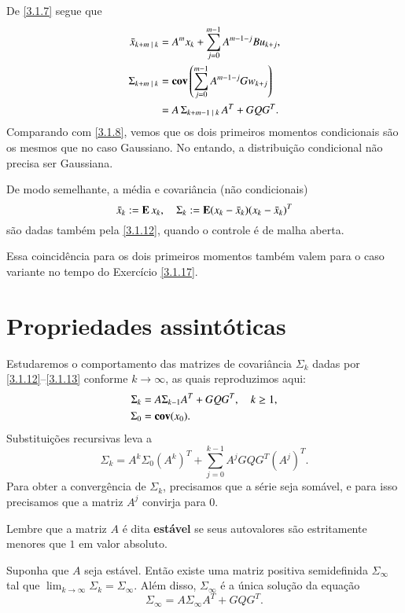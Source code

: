 De \eqref{3.1.7} segue que
\[
\begin{aligned}
	\bar x_{k+m\;|\;k}&= A^mx_k+
	\sum_{j=0}^{m-1}A^{m-1-j}Bu_{k+j},\\
	\Sigma_{k+m\;|\;k} &=
	\operatorname{\bf cov}\left(\sum_{j=0}^{m-1}A^{m-1-j}
	Gw_{k+j}\right)\\
	&=A\,\Sigma_{k+m-1\;|\;k}\,A^T+GQG^T.
\end{aligned}
\]
Comparando com \eqref{3.1.8}, vemos que os dois primeiros momentos condicionais são os mesmos que no caso Gaussiano. No entando, a distribuição condicional não precisa ser Gaussiana.

De modo semelhante, a média e covariância (não condicionais)
\[
	\bar x_k:=\operatorname{\bf E} x_k,\quad
	\Sigma_k:=\operatorname{\bf E}(x_k-\bar x_k)(x_k-\bar x_k)^T
\]
são dadas também pela \eqref{3.1.12}, quando o controle é de malha aberta.

Essa coincidência para os dois primeiros momentos também valem para o caso variante no tempo do Exercício \ref{3.1.17}.





\section{Propriedades assintóticas}
Estudaremos o comportamento das matrizes de covariância $\Sigma_k$ dadas por \eqref{3.1.12}--\eqref{3.1.13} conforme $k\to\infty$, as quais reproduzimos aqui:
\begin{align}
	\Sigma_k &= A\Sigma_{k-1}A^T+GQG^T,
	\quad k\ge 1, \label{3.3.1}\\
	\Sigma_0&=\operatorname{\bf cov}(x_0).
\end{align}
Substituições recursivas leva a
\begin{equation}\label{3.3.3}
	\Sigma_k = A^k\Sigma_0(A^k)^T+
	\sum_{j=0}^{k-1}A^jGQG^T(A^j)^T.
\end{equation}
Para obter a convergência de $\Sigma_k$, precisamos que a série seja somável, e para isso precisamos que a matriz $A^j$ convirja para $0$.

Lembre que a matriz $A$ é dita \textbf{estável} se seus autovalores são estritamente menores que $1$ em valor absoluto.

\begin{Teo}\label{3.3.4}
Suponha que $A$ seja estável. Então existe uma matriz positiva semidefinida $\Sigma_\infty$ tal que $\lim_{k\to \infty}\Sigma_k=\Sigma_\infty$. Além disso, $\Sigma_\infty$ é a única solução da equação
\begin{equation}\label{3.3.5}
	\Sigma_\infty = A \Sigma_\infty A^T
	+GQG^T.
\end{equation}
\end{Teo}

